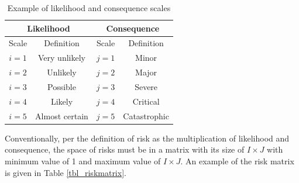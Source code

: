 \documentclass[10pt,halfline,a4paper]{ouparticle}
\begin{document}
\begin{table}
	\centering
	\caption{Example of likelihood and consequence scales} 
	\begin{tabular}{l|l|l|l}
		\hline
		\multicolumn{2}{c|}{Likelihood} & \multicolumn{2}{c}{Consequence} \\ 
		\hline
		\multicolumn{1}{c|}{Scale} & \multicolumn{1}{c|}{Definition} & \multicolumn{1}{c|}{Scale} & \multicolumn{1}{c}{Definition} \\ 
		\hline
		\multicolumn{1}{c|}{$i=1$} & \multicolumn{1}{c|}{Very unlikely} & \multicolumn{1}{c|}{$j=1$} & \multicolumn{1}{c}{Minor} \\ 
		\multicolumn{1}{c|}{$i=2$} & \multicolumn{1}{c|}{Unlikely} & \multicolumn{1}{c|}{$j=2$} & \multicolumn{1}{c}{Major} \\ 
		\multicolumn{1}{c|}{$i=3$} & \multicolumn{1}{c|}{Possible} & \multicolumn{1}{c|}{$j=3$} & \multicolumn{1}{c}{Severe} \\ 
		\multicolumn{1}{c|}{$i=4$} & \multicolumn{1}{c|}{Likely} & \multicolumn{1}{c|}{$j=4$} & \multicolumn{1}{c}{Critical} \\ 
		\multicolumn{1}{c|}{$i=5$} & \multicolumn{1}{c|}{Almost certain} & \multicolumn{1}{c|}{$j=5$} & \multicolumn{1}{c}{Catastrophic} \\ 
		\hline
	\end{tabular}
	\label{tbl_likeconse}
\end{table}

Conventionally, per the definition of risk as the multiplication of likelihood and consequence, the space of risks must be in a matrix with its size of $I\times J$ with minimum value of 1 and maximum value of $I\times J$. An example of the risk matrix is given in Table \ref{tbl_riskmatrix}.
\end{document}
